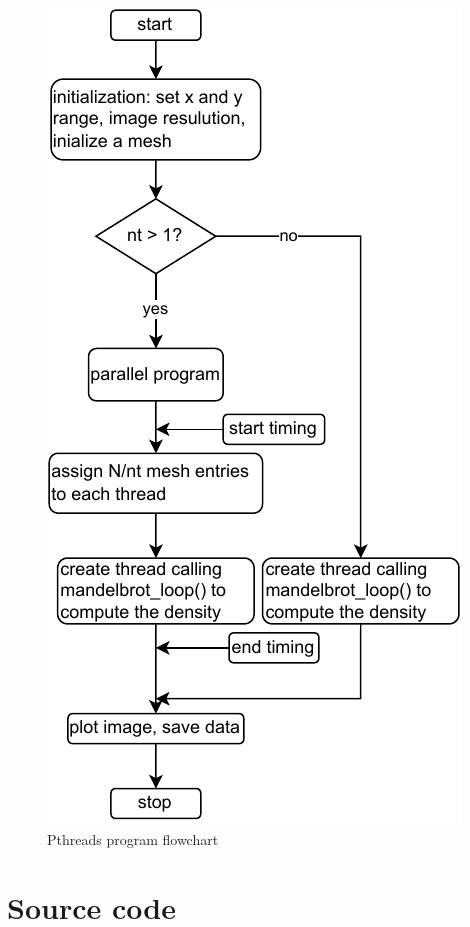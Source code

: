 \documentclass[twoside,12pt]{article}
\theoremstyle{definition}
\theoremstyle{remark}
\begin{document}
\begin{figure}[h!]
    \centering
    \includegraphics[scale=1.35]{../flowchart_pthread.drawio.pdf}
    \caption{Pthreads program flowchart}
    \label{fig:pthflow}
\end{figure}


\clearpage
\newpage
\section{Source code}











\end{document}
